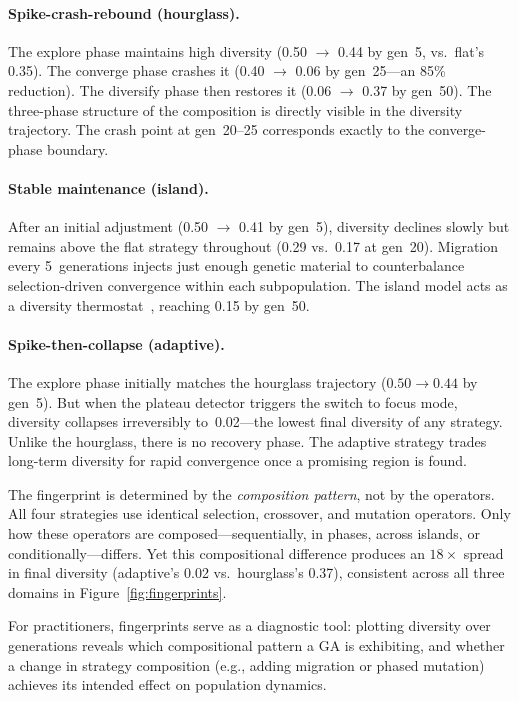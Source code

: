 \documentclass[dvipsnames,format=sigconf,anonymous=true,review=false]{acmart}
\begin{document}
\paragraph{Spike-crash-rebound (hourglass).}
The explore phase maintains high diversity (0.50 $\to$ 0.44 by gen~5, vs.\ flat's 0.35). The converge phase crashes it (0.40 $\to$ 0.06 by gen~25---an 85\% reduction). The diversify phase then restores it (0.06 $\to$ 0.37 by gen~50). The three-phase structure of the composition is directly visible in the diversity trajectory. The crash point at gen~20--25 corresponds exactly to the converge-phase boundary.

\paragraph{Stable maintenance (island).}
After an initial adjustment (0.50 $\to$ 0.41 by gen~5), diversity declines slowly but remains above the flat strategy throughout (0.29 vs.\ 0.17 at gen~20). Migration every 5~generations injects just enough genetic material to counterbalance selection-driven convergence within each subpopulation. The island model acts as a diversity thermostat~\cite{whitley1999island}, reaching 0.15 by gen~50.

\paragraph{Spike-then-collapse (adaptive).}
The explore phase initially matches the hourglass trajectory ($0.50 \to 0.44$ by gen~5). But when the plateau detector triggers the switch to focus mode, diversity collapses irreversibly to~0.02---the lowest final diversity of any strategy. Unlike the hourglass, there is no recovery phase. The adaptive strategy trades long-term diversity for rapid convergence once a promising region is found.

The fingerprint is determined by the \emph{composition pattern}, not by the operators.
All four strategies use identical selection, crossover, and mutation operators.
Only how these operators are composed---sequentially, in phases, across islands, or conditionally---differs.
Yet this compositional difference produces an $18\times$ spread in final diversity (adaptive's 0.02 vs.\ hourglass's 0.37), consistent across all three domains in Figure~\ref{fig:fingerprints}.

For practitioners, fingerprints serve as a diagnostic tool: plotting diversity over generations reveals which compositional pattern a GA is exhibiting, and whether a change in strategy composition (e.g., adding migration or phased mutation) achieves its intended effect on population dynamics.
\end{document}

